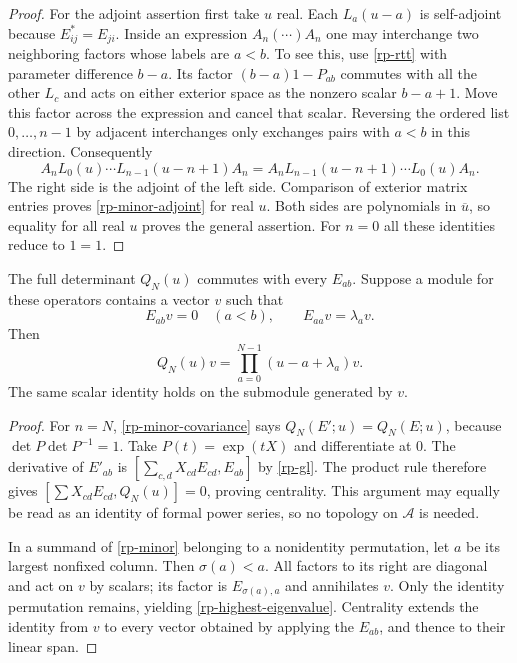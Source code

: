 \begin{proof}
For the adjoint assertion first take $u$ real.  Each
$L_a(u-a)$ is self-adjoint because $E_{ij}^*=E_{ji}$.
Inside an expression $A_n(\cdots)A_n$ one may interchange
two neighboring factors whose labels are $a<b$.
To see this, use \eqref{rp-rtt} with parameter difference
$b-a$.  Its factor $(b-a)1-P_{ab}$ commutes with all the
other $L_c$ and acts on either exterior space as the
nonzero scalar $b-a+1$.  Move this factor across the
expression and cancel that scalar.  Reversing the ordered
list $0,\ldots,n-1$ by adjacent interchanges only exchanges
pairs with $a<b$ in this direction.  Consequently
\[
 A_nL_0(u)\cdots L_{n-1}(u-n+1)A_n
 =
 A_nL_{n-1}(u-n+1)\cdots L_0(u)A_n.
\]
The right side is the adjoint of the left side.
Comparison of exterior matrix entries proves
\eqref{rp-minor-adjoint} for real $u$.  Both sides are
polynomials in $\overline u$, so equality for all real
$u$ proves the general assertion.  For $n=0$ all these
identities reduce to $1=1$.
\end{proof}

\begin{corollary}\label{rp-central-character}
The full determinant $Q_N(u)$ commutes with every $E_{ab}$.
Suppose a module for these operators contains a vector $v$
such that
\[
 E_{ab}v=0\quad(a<b),\qquad E_{aa}v=\lambda_a v.
\]
Then
\begin{equation}\label{rp-highest-eigenvalue}
                 Q_N(u)v=\prod_{a=0}^{N-1}(u-a+\lambda_a)v.
\end{equation}
The same scalar identity holds on the submodule generated
by $v$.
\end{corollary}

\begin{proof}
For $n=N$, \eqref{rp-minor-covariance} says $Q_N(E';u)
=Q_N(E;u)$, because $\det P\det P^{-1}=1$.
Take $P(t)=\exp(tX)$ and differentiate at $0$.
The derivative of $E'_{ab}$ is
$[\sum_{c,d}X_{cd}E_{cd},E_{ab}]$ by \eqref{rp-gl}.
The product rule therefore gives
$[\sum X_{cd}E_{cd},Q_N(u)]=0$, proving centrality.
This argument may equally be read as an identity of
formal power series, so no topology on $\mathcal A$ is
needed.

In a summand of \eqref{rp-minor} belonging to a nonidentity
permutation, let $a$ be its largest nonfixed column.
Then $\sigma(a)<a$.  All factors to its right are diagonal
and act on $v$ by scalars; its factor is $E_{\sigma(a),a}$
and annihilates $v$.  Only the identity permutation
remains, yielding \eqref{rp-highest-eigenvalue}.
Centrality extends the identity from $v$ to every vector
obtained by applying the $E_{ab}$, and thence to their
linear span.
\end{proof}


